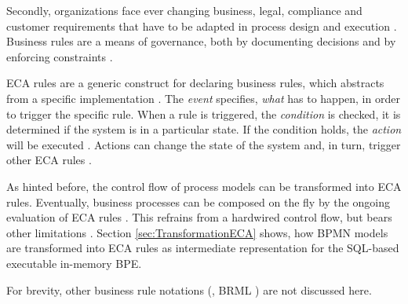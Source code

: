 Secondly, organizations face ever changing business, legal, compliance and customer requirements that have to be adapted in process design and execution \citep[]{Krumeich2014}. Business rules are a means of governance, both by documenting decisions and by enforcing constraints \citep[]{Muehlen2008}. 

\ac{ECA} rules are a generic construct for declaring business rules, which abstracts from a specific implementation \citep[]{Bry2006}. The \textit{event} specifies, \textit{what} has to happen, in order to trigger the specific rule. When a rule is triggered, the \textit{condition} is checked, \ie it is determined if the system is in a particular state. If the condition holds, the \textit{action} will be executed \citep[]{Bailey2002}. Actions can change the state of the system and, in turn, trigger other \ac{ECA} rules \citep[]{Krumeich2014}. 

As hinted before, the control flow of process models can be transformed into \ac{ECA} rules. Eventually, business processes can be composed on the fly by the ongoing evaluation of \ac{ECA} rules \citep[]{Gong2009}. This refrains from a hardwired control flow, but bears other limitations \citep[\cf][]{Bry2006}. Section \ref{sec:TransformationECA} shows, how \ac{BPMN} models are transformed into \ac{ECA} rules as intermediate representation for the \ac{SQL}-based executable in-memory \ac{BPE}.

For brevity, other business rule notations (\eg, \ac{BRML} \citep{Grosof1999}) are not discussed here.
